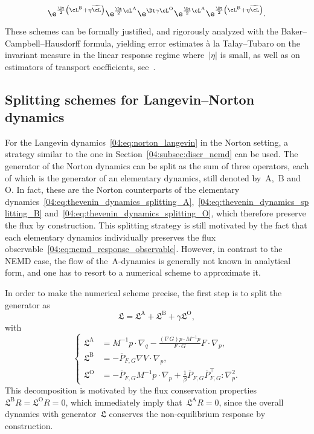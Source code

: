 \[\e^{\frac{\Dt}2\left(\cL^{\mathrm{B}}+\eta\widetilde{\cL}\right)}\e^{\frac\Dt2\cL^{\mathrm{A}}}\e^{\Dt\gamma\cL^{\mathrm{O}}}\e^{\frac\Dt2\cL^{\mathrm{A}}}\e^{\frac{\Dt}2\left(\cL^{\mathrm{B}}+\eta\widetilde{\cL}\right)}.\]
These schemes can be formally justified, and rigorously analyzed with the Baker--Campbell--Hausdorff formula, yielding error estimates \`a la Talay--Tubaro on the invariant measure in the linear response regime where~$|\eta|$ is small, as well as on estimators of transport coefficients, see~\cite{LMS16}.

\subsection{Splitting schemes for Langevin--Norton dynamics}\label{04:subsec:discr_norton}
For the Langevin dynamics~\eqref{04:eq:norton_langevin} in the Norton setting, a strategy similar to the one in Section~\ref{04:subsec:discr_nemd} can be used. The generator of the Norton dynamics can be split as the sum of three operators, each of which is the generator of an elementary dynamics, still denoted by~$\mathrm{A}$,~$\mathrm{B}$ and~$\mathrm{O}$. In fact, these are the Norton counterparts of the elementary dynamics~\eqref{04:eq:thevenin_dynamics_splitting_A},~\eqref{04:eq:thevenin_dynamics_splitting_B} and~\eqref{04:eq:thevenin_dynamics_splitting_O}, which therefore preserve the flux by construction. This splitting strategy is still motivated by the fact that each elementary dynamics individually preserves the flux observable~\eqref{04:eq:nemd_response_observable}.
However, in contrast to the NEMD case, the flow of the~$\mathrm{A}$-dynamics is generally not known in analytical form, and one has to resort to a numerical scheme to approximate it. 

In order to make the numerical scheme precise, the first step is to split the generator as
\begin{equation}
    \label{04:eq:norton_generator_splitting}
    \mathfrak{L} = \mathfrak{L}^{\mathrm{A}}+\mathfrak{L}^{\mathrm{B}}+\gamma\mathfrak{L}^{\mathrm{O}},
\end{equation}
with
\begin{equation}
    \label{04:eq:norton_generator_splitting_parts}
    \left\{
    \begin{aligned}
    \mathfrak{L}^{\mathrm{A}}&=M^{-1}p\cdot \nabla_q -\frac{\left(\nabla G\right) p \cdot M^{-1}p}{F\cdot G}F \cdot \nabla_p,\\
    \mathfrak{L}^{\mathrm{B}}&=-\overline{P}_{F,G}\nabla V\cdot \nabla_p,\\
    \mathfrak{L}^{\mathrm{O}}&=-\overline{P}_{F,G}M^{-1}p\cdot \nabla_p +\frac{1}{\beta} \overline{P}_{F,G}\overline{P}_{F,G}^\intercal:\nabla_p^2.
    \end{aligned}\right.
\end{equation}
This decomposition is motivated by the flux conservation properties~$\mathfrak{L}^{\mathrm{B}} R = \mathfrak{L}^{\mathrm{O}} R = 0$, which immediately imply that~$\mathfrak{L}^{\mathrm{A}}R=0$, since the overall dynamics with generator~$\mathfrak L$ conserves the non-equilibrium response by construction.

